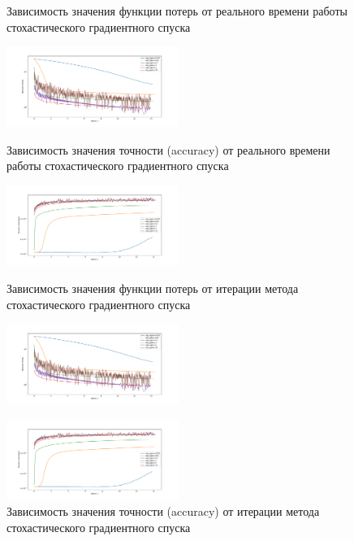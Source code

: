 \documentclass[a4paper, 11pt]{article}
\begin{document}
                \begin{figure}[H] \label{exp1}
                    \begin{multicols}{2}
                        \begin{center}
                            \caption{Зависимость значения функции потерь от реального времени работы стохастического градиентного спуска} \label{exp3:gd_func_time}
                            \includegraphics[width=0.5\textwidth, height=0.25\textheight]{../graphs/exp1_func_GD_alpha_time_beta=0,001.pdf}
                            
                            \caption{Зависимость значения точности (accuracy) от реального времени работы стохастического градиентного спуска} \label{exp3:gd_acc_time}
                            \includegraphics[width=0.5\textwidth, height=0.25\textheight]{../graphs/exp1_accuracy_GD_alpha_time_beta=0,001.pdf}
                            
                            \caption{Зависимость значения функции потерь от итерации метода стохастического градиентного спуска} \label{exp3:gd_func_iter}
                            \includegraphics[width=0.5\textwidth, height=0.25\textheight]{../graphs/exp1_func_GD_alpha_time_beta=0,001.pdf}
                            
                            \caption{Зависимость значения точности (accuracy) от итерации метода стохастического градиентного спуска} \label{exp3:gd_acc_iter}
                            \includegraphics[width=0.5\textwidth, height=0.25\textheight]{../graphs/exp1_accuracy_GD_alpha_time_beta=0,001.pdf}
                        \end{center}
                    \end{multicols}
                \end{figure}
            
\end{document}
